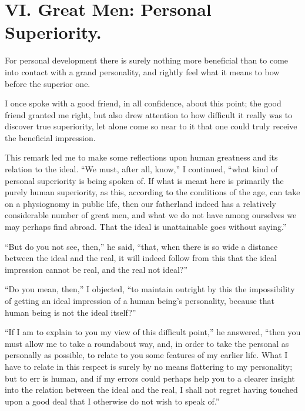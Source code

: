 \documentclass[12pt,a4paper]{book}
\begin{document}
\chapter*{VI. Great Men: Personal Superiority.}
\label{ch:forel6}

For personal development there is surely nothing more beneficial than to come into contact with a grand personality, and rightly feel what it means to bow before the superior one.

I once spoke with a good friend, in all confidence, about this point; the good friend granted me right, but also drew attention to how difficult it really was to discover true superiority, let alone come so near to it that one could truly receive the beneficial impression.

This remark led me to make some reflections upon human greatness and its relation to the ideal. ``We must, after all, know,'' I continued, ``what kind of personal superiority is being spoken of. If what is meant here is primarily the purely human superiority, as this, according to the conditions of the age, can take on a physiognomy in public life, then our fatherland indeed has a relatively considerable number of great men, and what we do not have among ourselves we may perhaps find abroad. That the ideal is unattainable goes without saying.''

``But do you not see, then,'' he said, ``that, when there is so wide a distance between the ideal and the real,
it will indeed follow from this that the ideal impression cannot be real, and the real not ideal?''

``Do you mean, then,'' I objected, ``to maintain outright by this the impossibility of getting an ideal impression of a human being's personality, because that human being is not the ideal itself?''

``If I am to explain to you my view of this difficult point,'' he answered, ``then you must allow me to take a roundabout way, and, in order to take the personal as personally as possible, to relate to you some features of my earlier life. What I have to relate in this respect is surely by no means flattering to my personality; but to err is human, and if my errors could perhaps help you to a clearer insight into the relation between the ideal and the real, I shall not regret having touched upon a good deal that I otherwise do not wish to speak of.''
\end{document}
